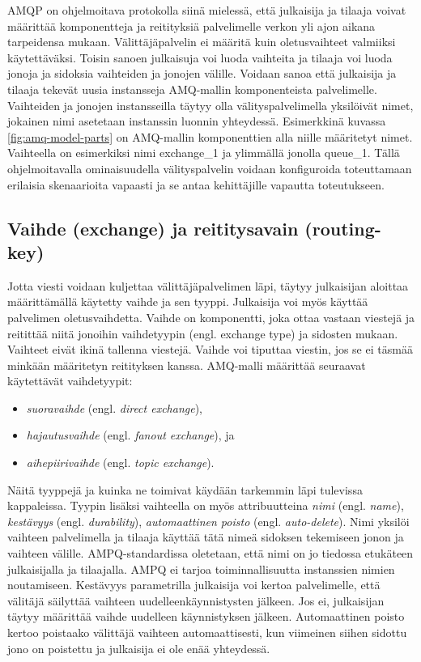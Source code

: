 AMQP on ohjelmoitava protokolla siinä mielessä, että julkaisija ja tilaaja voivat määrittää komponentteja ja reitityksiä palvelimelle verkon yli ajon aikana tarpeidensa mukaan. Välittäjäpalvelin ei määritä kuin oletusvaihteet valmiiksi käytettäväksi. Toisin sanoen julkaisuja voi luoda vaihteita ja tilaaja voi luoda jonoja ja sidoksia vaihteiden ja jonojen välille. Voidaan sanoa että julkaisija ja tilaaja tekevät uusia instansseja AMQ-mallin komponenteista palvelimelle. Vaihteiden ja jonojen instansseilla täytyy olla välityspalvelimella yksilöivät nimet, jokainen nimi asetetaan instanssin luonnin yhteydessä. Esimerkkinä kuvassa \ref{fig:amq-model-parts} on AMQ-mallin komponenttien alla niille määritetyt nimet. Vaihteella on esimerkiksi nimi exchange\_1 ja ylimmällä jonolla queue\_1. Tällä ohjelmoitavalla ominaisuudella välityspalvelin voidaan konfiguroida toteuttamaan erilaisia skenaarioita vapaasti ja se antaa kehittäjille vapautta toteutukseen.


\subsection{Vaihde (exchange) ja reititysavain (routing-key)}
Jotta viesti voidaan kuljettaa välittäjäpalvelimen läpi, täytyy julkaisijan aloittaa määrittämällä käytetty vaihde ja sen tyyppi. Julkaisija voi myös käyttää palvelimen oletusvaihdetta. Vaihde on komponentti, joka ottaa vastaan viestejä ja reitittää niitä jonoihin vaihdetyypin (engl. exchange type) ja sidosten mukaan. Vaihteet eivät ikinä tallenna viestejä. Vaihde voi tiputtaa viestin, jos se ei täsmää minkään määritetyn reitityksen kanssa. AMQ-malli määrittää seuraavat käytettävät vaihdetyypit:
\begin{itemize}
	\item \emph{suoravaihde} (engl. \emph{direct exchange}),
	\item \emph{hajautusvaihde} (engl. \emph{fanout exchange}), ja
	\item \emph{aihepiirivaihde} (engl. \emph{topic exchange}).
\end{itemize}

Näitä tyyppejä ja kuinka ne toimivat käydään tarkemmin läpi tulevissa kappaleissa. Tyypin lisäksi vaihteella on myös attribuutteina \emph{nimi} (engl. \emph{name}), \emph{kestävyys} (engl. \emph{durability}), \emph{automaattinen poisto} (engl. \emph{auto-delete}). Nimi yksilöi vaihteen palvelimella ja tilaaja käyttää tätä nimeä sidoksen tekemiseen jonon ja vaihteen välille. AMPQ-standardissa oletetaan, että nimi on jo tiedossa etukäteen julkaisijalla ja tilaajalla. AMPQ ei tarjoa toiminnallisuutta instanssien nimien noutamiseen. Kestävyys parametrilla julkaisija voi kertoa palvelimelle, että välitäjä säilyttää vaihteen uudelleenkäynnistysten jälkeen. Jos ei, julkaisijan täytyy määrittää vaihde uudelleen käynnistyksen jälkeen. Automaattinen poisto kertoo poistaako välittäjä vaihteen automaattisesti, kun viimeinen siihen sidottu jono on poistettu ja julkaisija ei ole enää yhteydessä.

